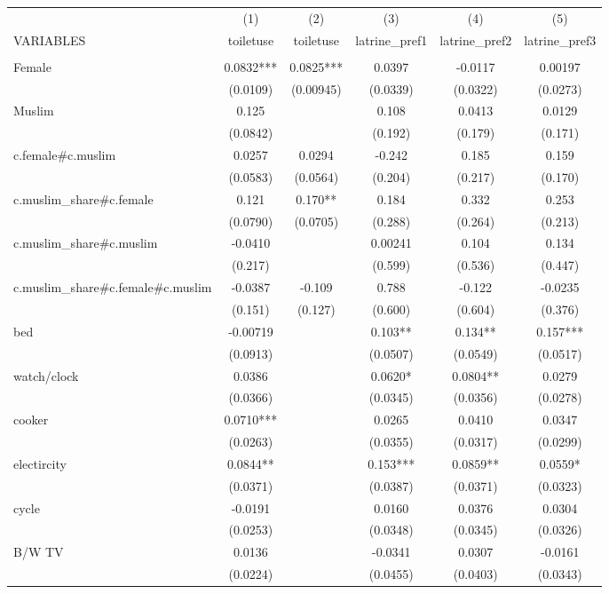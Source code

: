 \begin{tabular}{lccccc} \hline
 & (1) & (2) & (3) & (4) & (5) \\
VARIABLES & toiletuse & toiletuse & latrine\_pref1 & latrine\_pref2 & latrine\_pref3 \\ \hline
 &  &  &  &  &  \\
Female & 0.0832*** & 0.0825*** & 0.0397 & -0.0117 & 0.00197 \\
 & (0.0109) & (0.00945) & (0.0339) & (0.0322) & (0.0273) \\
Muslim & 0.125 &  & 0.108 & 0.0413 & 0.0129 \\
 & (0.0842) &  & (0.192) & (0.179) & (0.171) \\
c.female\#c.muslim & 0.0257 & 0.0294 & -0.242 & 0.185 & 0.159 \\
 & (0.0583) & (0.0564) & (0.204) & (0.217) & (0.170) \\
c.muslim\_share\#c.female & 0.121 & 0.170** & 0.184 & 0.332 & 0.253 \\
 & (0.0790) & (0.0705) & (0.288) & (0.264) & (0.213) \\
c.muslim\_share\#c.muslim & -0.0410 &  & 0.00241 & 0.104 & 0.134 \\
 & (0.217) &  & (0.599) & (0.536) & (0.447) \\
c.muslim\_share\#c.female\#c.muslim & -0.0387 & -0.109 & 0.788 & -0.122 & -0.0235 \\
 & (0.151) & (0.127) & (0.600) & (0.604) & (0.376) \\
bed & -0.00719 &  & 0.103** & 0.134** & 0.157*** \\
 & (0.0913) &  & (0.0507) & (0.0549) & (0.0517) \\
watch/clock & 0.0386 &  & 0.0620* & 0.0804** & 0.0279 \\
 & (0.0366) &  & (0.0345) & (0.0356) & (0.0278) \\
cooker & 0.0710*** &  & 0.0265 & 0.0410 & 0.0347 \\
 & (0.0263) &  & (0.0355) & (0.0317) & (0.0299) \\
electircity & 0.0844** &  & 0.153*** & 0.0859** & 0.0559* \\
 & (0.0371) &  & (0.0387) & (0.0371) & (0.0323) \\
cycle & -0.0191 &  & 0.0160 & 0.0376 & 0.0304 \\
 & (0.0253) &  & (0.0348) & (0.0345) & (0.0326) \\
B/W TV & 0.0136 &  & -0.0341 & 0.0307 & -0.0161 \\
 & (0.0224) &  & (0.0455) & (0.0403) & (0.0343) \\

\end{tabular}
